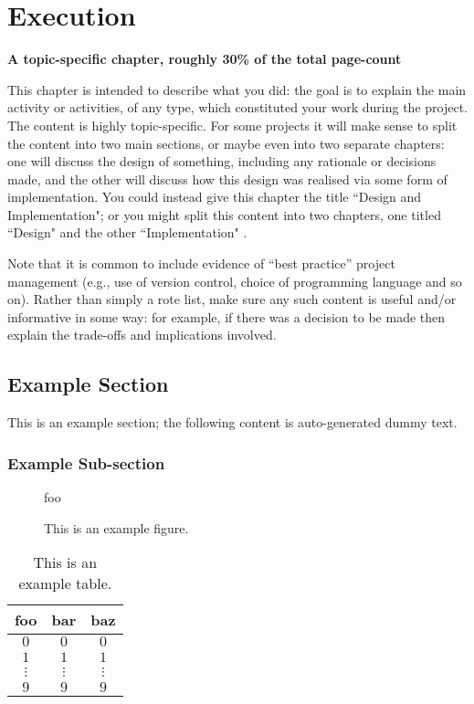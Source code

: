 \documentclass[ %
                    author={James Stephenson},
                supervisor={Dr. Edwin Simpson},
                    degree={MSc},
                     title={Bayesian Deep Learning For Extractive Test Summarisation},
                  subtitle={},
                      type={},
                      year={2023}]{../additions/dissertation}
\begin{document}
	
	\chapter{Execution}
	\label{chap:execution}
	
		{\bf A topic-specific chapter, roughly 30\% of the total page-count}
		\vspace{1cm} 
		
		\noindent
		This chapter is intended to describe what you did: the goal is to explain
		the main activity or activities, of any type, which constituted your work 
		during the project.  The content is highly topic-specific. For some 
		projects it will make sense to split the content into two main sections, or maybe even into two separate chapters: one 
		will discuss the design of something, including any rationale or decisions made, 
		and the other will discuss how this design was realised via some form of 
		implementation.  You could instead give this chapter the title ``Design and Implementation"; or you might split this content into two chapters, one titled ``Design" and the other ``Implementation" .
		
		Note that it is common to include evidence of ``best practice'' project 
		management (e.g., use of version control, choice of programming language 
		and so on).  Rather than simply a rote list, make sure any such content 
		is useful and/or informative in some way: for example, if there was a 
		decision to be made then explain the trade-offs and implications 
		involved.
		
		\section{Example Section}
		
			This is an example section; 
			the following content is auto-generated dummy text.
			\lipsum
			
			\subsection{Example Sub-section}
			
				\begin{figure}[t]
					\centering
					foo
					\caption{This is an example figure.}
					\label{fig}
				\end{figure}
				
				\begin{table}[t]
					\centering
					\begin{tabular}{|cc|c|}
						\hline
						foo      & bar      & baz      \\
						\hline
						$0     $ & $0     $ & $0     $ \\
						$1     $ & $1     $ & $1     $ \\
						$\vdots$ & $\vdots$ & $\vdots$ \\
						$9     $ & $9     $ & $9     $ \\
						\hline
					\end{tabular}
					\caption{This is an example table.}
					\label{tab}
				\end{table}
				
\end{document}
